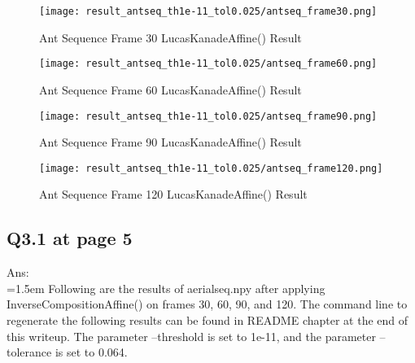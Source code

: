 \documentclass{article}
\begin{document}
	\begin{figure}[H]
	\centering
	\begin{minipage}[b]{0.45\textwidth}
		\centering
		\texttt{[image: result\_antseq\_th1e-11\_tol0.025/antseq\_frame30.png]}  %
		\caption{Ant Sequence Frame 30 LucasKanadeAffine() Result}
		\label{fig:Q2_3_Ant_frame_30_result}
	\end{minipage}
	\hfill  %
	\begin{minipage}[b]{0.45\textwidth}
		\centering
		\texttt{[image: result\_antseq\_th1e-11\_tol0.025/antseq\_frame60.png]}  %
		\caption{Ant Sequence Frame 60 LucasKanadeAffine() Result}
		\label{fig:Q2_3_Ant_frame_60_result}
	\end{minipage}	
	\end{figure}
	\begin{figure}[H]
	\centering
	\begin{minipage}[b]{0.45\textwidth}
		\centering
		\texttt{[image: result\_antseq\_th1e-11\_tol0.025/antseq\_frame90.png]}  %
		\caption{Ant Sequence Frame 90 LucasKanadeAffine() Result}
		\label{fig:Q2_3_Ant_frame_90_result}
	\end{minipage}
	\hfill  %
	\begin{minipage}[b]{0.45\textwidth}
		\centering
		\texttt{[image: result\_antseq\_th1e-11\_tol0.025/antseq\_frame120.png]}  %
		\caption{Ant Sequence Frame 120 LucasKanadeAffine() Result}
		\label{fig:Q2_3_Ant_frame_120_result}
	\end{minipage}	
	\end{figure}	
	

	\newpage
	\subsection*{Q3.1 at page 5}
	Ans:\\
	\hangindent=1.5em \hspace{1.5em} Following are the results of aerialseq.npy after applying InverseCompositionAffine() on frames 30, 60, 90, and 120. The command line to regenerate the following results can be found in README chapter at the end of this writeup. The parameter --threshold is set to 1e-11, and the parameter --tolerance is set to 0.064.
	
\end{document}

